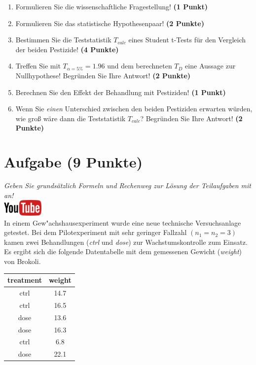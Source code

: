 \documentclass[a4paper, 9pt]{scrartcl}\usepackage[]{graphicx}\usepackage[]{xcolor}
\begin{document}
\begin{enumerate}
  \item Formulieren Sie die wissenschaftliche Fragestellung! \textbf{(1 Punkt)}
  \item Formulieren Sie das statistische Hypothesenpaar! \textbf{(2
      Punkte)}
  \item Bestimmen Sie die Teststatistik $T_{calc}$ eines Student t-Tests f{\"u}r den
  Vergleich der beiden Pestizide! \textbf{(4 Punkte)}
\item Treffen Sie mit $T_{\alpha = 5\%} = 1.96$ und dem berechneten $T_{D}$ eine Aussage
  zur Nullhypothese! Begr{\"u}nden Sie Ihre Antwort! \textbf{(2 Punkte)}
\item Berechnen Sie den Effekt der Behandlung mit Pestiziden! \textbf{(1 Punkt)}
\item Wenn Sie \textit{einen} Unterschied zwischen den beiden
  Pestiziden erwarten w{\"u}rden, wie gro{\ss} w{\"a}re dann die Teststatistik
  $T_{calc}$? Begr{\"u}nden Sie Ihre Antwort! \textbf{(2 Punkte)}
\end{enumerate} 
\clearpage

\section{Aufgabe \hfill (9 Punkte)}

\textit{Geben Sie grunds{\"a}tzlich Formeln und Rechenweg zur L{\"o}sung der
  Teilaufgaben mit an!} \\[1Ex]

\hfill\href{https://youtu.be/eejS2uG4o-M}{\includegraphics[width =
  2cm]{img/youtube}}\\[1Ex]



In einem Gew{"a}chshausexperiment wurde eine neue technische Versuchsanlage getestet. Bei dem
Pilotexperiment mit sehr geringer Fallzahl $(n_1 = n_2 = 3)$ kamen zwei
Behandlungen (\textit{ctrl} und \textit{dose}) zur Wachstumskontrolle zum
Einsatz. Es ergibt sich die folgende Datentabelle mit dem gemessenen
Gewicht (\textit{weight}) von Brokoli.

\begin{table}[!h]
\centering
\begin{tabular}{cc}
\toprule
treatment & weight\\
\midrule
ctrl & 14.7\\
ctrl & 16.5\\
dose & 13.6\\
dose & 16.3\\
ctrl & 6.8\\
\addlinespace
dose & 22.1\\
\bottomrule
\end{tabular}
\end{table}
\end{document}
